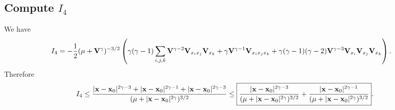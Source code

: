 \subsection{Compute $I_4$} We have
\begin{align*}
    I_4 &= -\frac{1}{2}(\mu+\mathbf{V}^\gamma)^{-3/2} 
    \left(
        \gamma(\gamma-1) \sum_{i,j,k} \mathbf{V}^{\gamma-2} \mathbf{V}_{x_ix_j}\mathbf{V}_{x_k} 
        +
        \gamma \mathbf{V}^{\gamma-1} \mathbf{V}_{x_ix_jx_k} 
        +
        \gamma(\gamma-1)(\gamma-2)\mathbf{V}^{\gamma-3} \mathbf{V}_{x_i}\mathbf{V}_{x_j}\mathbf{V}_{x_k}
    \right).
\end{align*}
Therefore 
\begin{align*}
    I_4 \leq \frac
            {
                |\mathbf{x}-\mathbf{x}_0|^{2\gamma-3} + |\mathbf{x}-\mathbf{x}_0|^{2\gamma-1} + |\mathbf{x}-\mathbf{x}_0|^{2\gamma-3}
            }
            {
                (\mu+|\mathbf{x}-\mathbf{x}_0|^{2\gamma})^{3/2}
            }
            \leq 
            \fbox{$\displaystyle
                \frac{|\mathbf{x}-\mathbf{x}_0|^{2\gamma-3}}
                {(\mu+|\mathbf{x}-\mathbf{x}_0|^{2\gamma})^{3/2}}
                + 
                \frac{|\mathbf{x}-\mathbf{x}_0|^{2\gamma-1}}
                {(\mu+|\mathbf{x}-\mathbf{x}_0|^{2\gamma})^{3/2}}
            $}. 
\end{align*}
